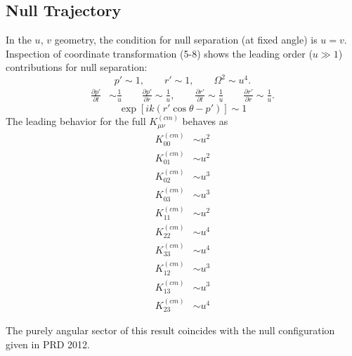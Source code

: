 \documentclass[10pt,letterpaper]{article}
\begin{document}
\subsection*{Null Trajectory}
In the $u$, $v$ geometry, the condition for null separation (at fixed angle) is $u=v$. Inspection of coordinate transformation (5-8) shows the leading order ($u\gg 1$) contributions for null separation:
\begin{equation}
p' \sim 1,\qquad r' \sim 1,\qquad \Omega^2 \sim u^4.
\end{equation}
\begin{align}
\frac{\partial p'}{\partial t} & \sim  \frac{1}{u}\qquad
\frac{\partial p'}{\partial r}  \sim 	\frac{1}{u},\qquad
\frac{\partial r'}{\partial t}  \sim \frac{1}{u}\qquad
\frac{\partial r'}{\partial r}  \sim  \frac{1}{u}.
\end{align}
\begin{equation}
\exp[{ik(r'\cos\theta-p')} ]\sim 1
\end{equation}
The leading behavior for the full $K_{\mu\nu}^{(cm)}$ behaves as
\begin{align}
K^{(cm)}_{00} &\sim u^2 \nonumber\\
K^{(cm)}_{01} &\sim  u^2\nonumber\\
K^{(cm)}_{02} &\sim  u^3\nonumber\\
K^{(cm)}_{03} &\sim   u^3\nonumber\\
K^{(cm)}_{11} &\sim  u^2\nonumber\\
K^{(cm)}_{22} &\sim  u^4\nonumber\\
K^{(cm)}_{33} &\sim  u^4\nonumber\\
K^{(cm)}_{12} &\sim u^3\nonumber\\
K^{(cm)}_{13} &\sim u^3\nonumber\\
K^{(cm)}_{23} &\sim u^4
\end{align}

The purely angular sector of this result coincides with the null configuration given in PRD 2012.
\end{document}
